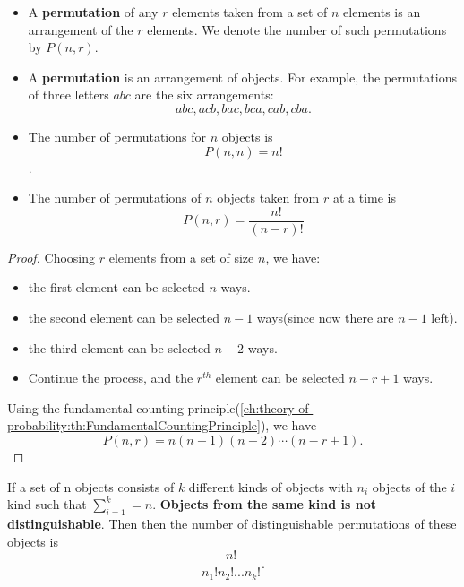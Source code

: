 \begin{refsection}
\begin{definition}[permutation]
\begin{itemize}
	\item A \textbf{permutation} of any $r$ elements taken from a set of $n$ elements is an arrangement of the $r$ elements. We denote the number of such permutations by $P(n,r)$.
	\item  A \textbf{permutation} is an arrangement of objects. For example, the permutations of three letters $abc$ are the six arrangements:
	$$abc,acb,bac,bca,cab,cba.$$
\end{itemize}
\end{definition}


\begin{theorem}\hfill
	\begin{itemize}
		\item The number of permutations for $n$ objects is $$P(n,n) = n!$$.
		\item The number of permutations of $n$ objects taken from $r$ at a time is
		$$P(n,r) = \frac{n!}{(n-r)!}$$
	\end{itemize}
\end{theorem}
\begin{proof}
Choosing $r$ elements from a set of size $n$, we have:
\begin{itemize}
	\item the first element can be selected $n$ ways.
	\item the second element can be selected $n-1$ ways(since now there are $n-1$ left).
	\item the third element can be selected $n-2$ ways.
	\item Continue the process, and the $r^{th}$ element can be selected $n-r+1$ ways.
\end{itemize}	
Using the fundamental counting principle(\autoref{ch:theory-of-probability:th:FundamentalCountingPrinciple}), we have 
$$P(n,r) = n(n-1)(n-2)\cdots (n-r+1).$$
\end{proof}

\begin{lemma}
	If a set of n objects consists of $k$ different kinds of objects with $n_i$ objects of
	the $i$ kind such that $\sum_{i=1}^k = n$. \textbf{Objects from the same kind is not distinguishable}. Then then the number of distinguishable
	permutations of these objects is
	$$\frac{n!}{n_1!n_2!...n_k!}.$$
\end{lemma}


\end{refsection}
